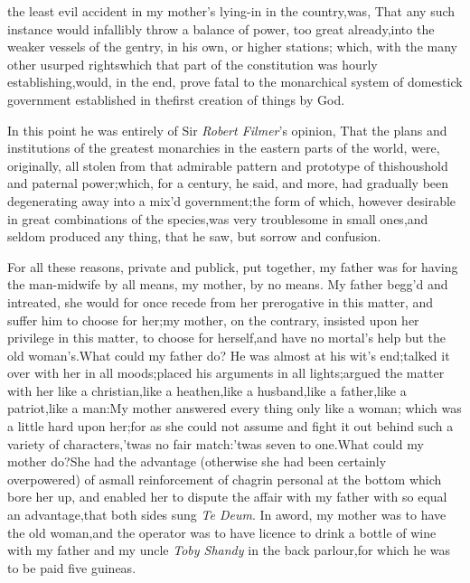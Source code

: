 \documentclass{article}
\begin{document}
\noindent
{}
the least evil accident in my mother’s lying-in in the
country,\tsh  was, That any such instance would infallibly throw
a balance of power, too great already,\break into the weaker
vessels of the gentry, in his own, or higher stations;\tsh
which, with the many other usurped rights\break which that part
of the constitution was hourly establishing,\tsk  would, in the
end, prove fatal to the monarchical system of domestick
government established in the\break first creation of things by
God.

In this point he was entirely of Sir \textit{Robert Filmer}’s
opinion, That the plans and institutions of the greatest
monarchies in the eastern parts of the world, were, originally,
all stolen from that admirable pattern and prototype of
this\break houshold and paternal power;\tsk  which, for a
century, he said, and more, had gradually been
degenerating away into a mix’d government;\tsh  the form of
which, however desirable in great combinations of the
species,\tsh  was very troublesome in small ones,\tsk  and
seldom produced any thing, that he saw, but sorrow and
confusion.

For all these reasons, private and pub\-lick, put together,\tsk
my father was for having the man-midwife by all means,\tsk\break
my mother, by no means. My father begg’d and intreated, she
would for once recede from her prerogative in this matter, and
suffer him to choose for her;\tsk\break  my mother, on the
contrary, insisted up\-on her privilege in this matter, to
choose for herself,\tsk  and have no mortal’s help but the old
woman’s.\tsk  What could my father do? He was almost at his
wit’s end;\tsh  talked it over with her in all
moods;\tsk  placed his arguments in all lights;\tsk  argued the
matter with her like a christian,\tsk  like a heathen,\tsk  like
a husband,\tsk  like a father,\tsk  like a patriot,\tsk  like a
man:\tsk  My mother answered every thing only like a woman;
which was a little hard upon her;\tsk  for as she could not
assume and fight it out behind such a variety of
characters,\tsk\break  ’twas no fair match:\tsk  ’twas seven to
one.\tsk  What could my mother do?\tsk\break  She had the
advantage (otherwise she had been certainly overpowered) of
a\break small reinforcement of chagrin personal at the bottom
which bore her up, and enabled her to dispute the affair with my
father with so equal an advantage,\tsh\break  that both sides
sung \textit{Te Deum}. In a\break word, my mother was to have
the old woman,\tsk  and the operator was to have licence to
drink a bottle of wine with my father and my uncle
\textit{Toby Shandy} in the back parlour,\tsk  for which he was
to be paid five guineas.
\end{document}
